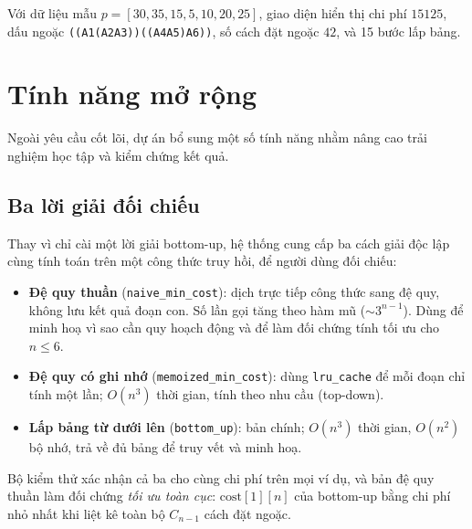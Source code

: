 \documentclass[12pt,a4paper]{article}
\begin{document}
Với dữ liệu mẫu $p = [30, 35, 15, 5, 10, 20, 25]$, giao diện hiển thị chi phí $15125$, dấu ngoặc \texttt{((A1(A2A3))((A4A5)A6))}, số cách đặt ngoặc $42$, và 15 bước lấp bảng.

\section{Tính năng mở rộng}

Ngoài yêu cầu cốt lõi, dự án bổ sung một số tính năng nhằm nâng cao trải nghiệm học tập và kiểm chứng kết quả.

\subsection{Ba lời giải đối chiếu}
Thay vì chỉ cài một lời giải bottom-up, hệ thống cung cấp ba cách giải độc lập cùng tính toán trên một công thức truy hồi, để người dùng đối chiếu:
\begin{itemize}
  \item \textbf{Đệ quy thuần} (\texttt{naive\_min\_cost}): dịch trực tiếp công thức sang đệ quy, không lưu kết quả đoạn con. Số lần gọi tăng theo hàm mũ ($\sim 3^{n-1}$). Dùng để minh hoạ vì sao cần quy hoạch động và để làm đối chứng tính tối ưu cho $n \le 6$.
  \item \textbf{Đệ quy có ghi nhớ} (\texttt{memoized\_min\_cost}): dùng \texttt{lru\_cache} để mỗi đoạn chỉ tính một lần; $O(n^3)$ thời gian, tính theo nhu cầu (top-down).
  \item \textbf{Lấp bảng từ dưới lên} (\texttt{bottom\_up}): bản chính; $O(n^3)$ thời gian, $O(n^2)$ bộ nhớ, trả về đủ bảng để truy vết và minh hoạ.
\end{itemize}
Bộ kiểm thử xác nhận cả ba cho cùng chi phí trên mọi ví dụ, và bản đệ quy thuần làm đối chứng \emph{tối ưu toàn cục}: $\mathrm{cost}[1][n]$ của bottom-up bằng chi phí nhỏ nhất khi liệt kê toàn bộ $C_{n-1}$ cách đặt ngoặc.
\end{document}
